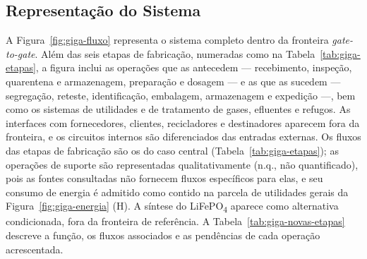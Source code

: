 
\subsection{Representação do Sistema}
\label{subsec:giga-diagrama}

A Figura~\ref{fig:giga-fluxo} representa o sistema completo dentro da fronteira
\textit{gate-to-gate}. Além das seis etapas de fabricação, numeradas como na
Tabela~\ref{tab:giga-etapas}, a figura inclui as
operações que as antecedem — recebimento, inspeção, quarentena e armazenagem,
preparação e dosagem — e as que as sucedem — segregação, reteste,
identificação, embalagem, armazenagem e expedição —, bem como os sistemas de
utilidades e de tratamento de gases, efluentes e refugos. As interfaces com
fornecedores, clientes, recicladores e destinadores aparecem fora da fronteira, e
os circuitos internos são diferenciados das entradas externas. Os fluxos das
etapas de fabricação são os do caso central (Tabela~\ref{tab:giga-etapas}); as
operações de suporte são representadas qualitativamente (n.q., não quantificado),
pois as fontes consultadas não fornecem fluxos específicos para elas, e seu
consumo de energia é admitido como contido na parcela de utilidades gerais da
Figura~\ref{fig:giga-energia} (H). A síntese do LiFePO\textsubscript{4} aparece
como alternativa condicionada, fora da fronteira de referência. A
Tabela~\ref{tab:giga-novas-etapas} descreve a função, os fluxos associados e as
pendências de cada operação acrescentada.

